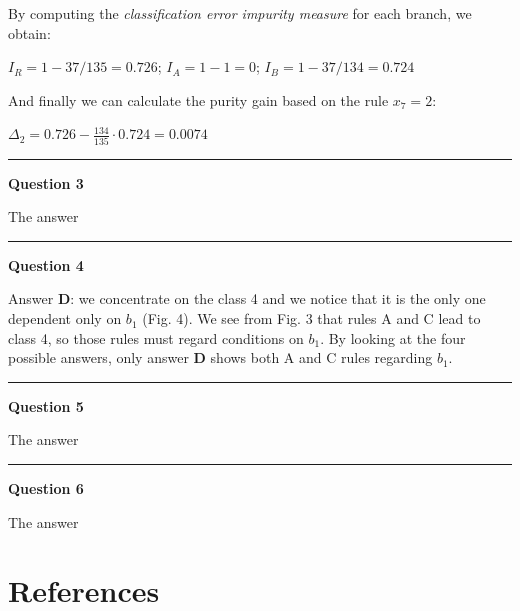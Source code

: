 \documentclass[
]{article}
\begin{document}
By computing the \emph{classification error impurity measure} for each
branch, we obtain:

\(I_R=1-37/135=0.726\); \(I_A=1-1=0\); \(I_B=1-37/134=0.724\)

And finally we can calculate the purity gain based on the rule
\(x_7=2\):

\(\Delta_2=0.726-\frac{134}{135}\cdot 0.724=0.0074\)

\begin{center}\rule{0.5\linewidth}{0.5pt}\end{center}

\textbf{Question 3}

The answer

\begin{center}\rule{0.5\linewidth}{0.5pt}\end{center}

\textbf{Question 4}

Answer \textbf{D}: we concentrate on the class 4 and we notice that it
is the only one dependent only on \(b_1\) (Fig. 4). We see from Fig. 3
that rules A and C lead to class 4, so those rules must regard
conditions on \(b_1\). By looking at the four possible answers, only
answer \textbf{D} shows both A and C rules regarding \(b_1\).

\begin{center}\rule{0.5\linewidth}{0.5pt}\end{center}

\textbf{Question 5}

The answer

\begin{center}\rule{0.5\linewidth}{0.5pt}\end{center}

\textbf{Question 6}

The answer

\newpage

\hypertarget{references}{%
\section{References}\label{references}}
\end{document}
